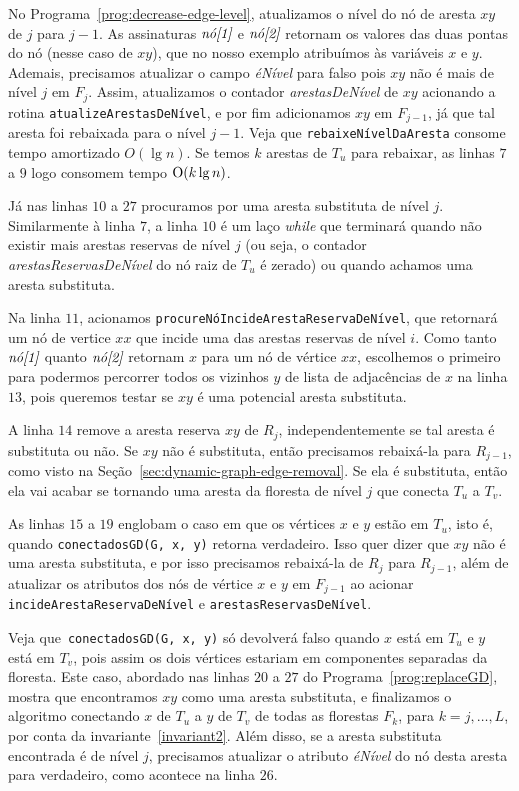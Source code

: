No Programa~\ref{prog:decrease-edge-level}, atualizamos o nível do nó de aresta $xy$ de $j$ para $j-1$. As assinaturas $\emph{nó[1]}$ e $\emph{nó[2]}$ retornam os valores das duas pontas do nó (nesse caso de $xy$), que no nosso exemplo atribuímos às variáveis $x$ e $y$. Ademais, precisamos atualizar o campo \textit{éNível} para falso pois $xy$ não é mais de nível $j$ em $F_j$. Assim, atualizamos o contador \textit{arestasDeNível} de $xy$ acionando a rotina \texttt{atualizeArestasDeNível}, e por fim adicionamos $xy$ em $F_{j-1}$, já que tal aresta foi rebaixada para o nível $j-1$. Veja que \texttt{rebaixeNívelDaAresta} consome tempo amortizado $O(\lg n)$. Se temos $k$ arestas de $T_u$ para rebaixar, as linhas $7$ a $9$ logo consomem tempo $\mathrm{O}(k \lg n)$.  

Já nas linhas $10$ a $27$ procuramos por uma aresta substituta de nível $j$. Similarmente à linha $7$, a linha $10$ é um laço \textit{while} que terminará quando não existir mais arestas reservas de nível $j$ (ou seja, o contador \textit{arestasReservasDeNível} do nó raiz de $T_u$ é zerado) ou quando achamos uma aresta substituta.  

Na linha $11$, acionamos \texttt{procureNóIncideArestaReservaDeNível}, que retornará um nó de vertice $xx$ que incide uma das arestas reservas de nível $i$. Como tanto $\emph{nó[1]}$ quanto $\emph{nó[2]}$ retornam $x$ para um nó de vértice $xx$, escolhemos o primeiro para podermos percorrer todos os vizinhos $y$ de lista de adjacências de $x$ na linha $13$, pois queremos testar se $xy$ é uma potencial aresta substituta.

A linha $14$ remove a aresta reserva $xy$ de $R_j$, independentemente se tal aresta é substituta ou não. Se $xy$ não é substituta, então precisamos rebaixá-la para $R_{j-1}$, como visto na Seção~\ref{sec:dynamic-graph-edge-removal}. Se ela é substituta, então ela vai acabar se tornando uma aresta da floresta de nível $j$ que conecta $T_u$ a $T_v$.

As linhas $15$ a $19$ englobam o caso em que os vértices $x$ e $y$ estão em $T_u$, isto é, quando \texttt{conectadosGD(G, x, y)} retorna verdadeiro. Isso quer dizer que $xy$ não é uma aresta substituta, e por isso precisamos rebaixá-la de $R_j$ para $R_{j-1}$, além de atualizar os atributos dos nós de vértice $x$ e $y$ em $F_{j-1}$ ao acionar \texttt{incideArestaReservaDeNível} e \texttt{arestasReservasDeNível}.

Veja que~\texttt{conectadosGD(G, x, y)} só devolverá falso quando $x$ está em $T_u$ e $y$ está em $T_v$, pois assim os dois vértices estariam em componentes separadas da floresta. Este caso, abordado nas linhas $20$ a $27$ do Programa~\ref{prog:replaceGD}, mostra que encontramos $xy$ como uma aresta substituta, e finalizamos o algoritmo conectando $x$ de $T_u$ a $y$ de $T_v$ de todas as florestas $F_k$, para $k = j, \ldots, L$, por conta da invariante~\ref{invariant2}. Além disso, se a aresta substituta encontrada é de nível $j$, precisamos atualizar o atributo \textit{éNível} do nó desta aresta para verdadeiro, como acontece na linha $26$.

